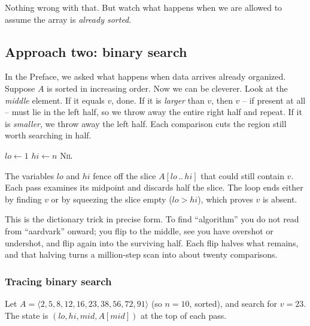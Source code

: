 Nothing wrong
with that. But watch what happens when we are allowed to assume the array is
\emph{already sorted}.

\subsection{Approach two: binary search}

In the Preface, we asked what happens when data arrives already organized. Suppose $A$
is sorted in increasing order. Now we can be cleverer. Look at the \emph{middle}
element. If it equals $v$, done. If it is \emph{larger} than $v$, then $v$ -- if
present at all -- must lie in the left half, so we throw away the entire right half and
repeat. If it is \emph{smaller}, we throw away the left half. Each comparison cuts the
region still worth searching in half.

\begin{algorithm}[H]
\caption{\textsc{Binary-Search} (on a sorted array)}
$lo \gets 1$\;
$hi \gets n$\;
\Return \textsc{Nil}\;
\end{algorithm}

The variables $lo$ and $hi$ fence off the slice $A[lo\,..\,hi]$ that could still
contain $v$. Each pass examines its midpoint and discards half the slice. The loop
ends either by finding $v$ or by squeezing the slice empty ($lo > hi$), which proves
$v$ is absent.

\begin{intuitionbox}
This is the dictionary trick in precise form. To find ``algorithm'' you do not read from
``aardvark'' onward; you flip to the middle, see you have overshot or undershot, and
flip again into the surviving half. Each flip halves what remains, and that
halving turns a million-step scan into about twenty comparisons.
\end{intuitionbox}

\subsubsection{Tracing binary search}

Let $A = \langle 2, 5, 8, 12, 16, 23, 38, 56, 72, 91 \rangle$ (so $n = 10$, sorted),
and search for $v = 23$. The state is $(lo, hi, mid, A[mid])$ at the top of each pass.


